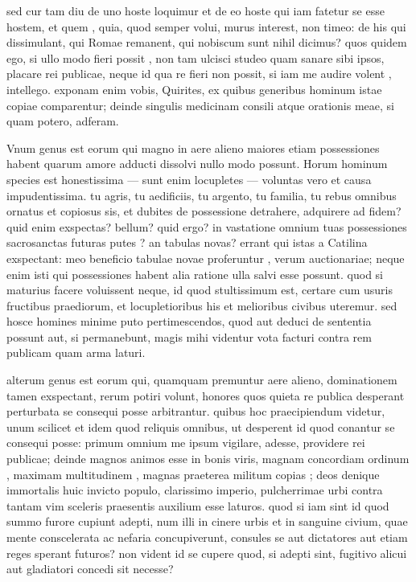  sed cur tam diu de uno hoste loquimur et de eo hoste qui iam fatetur se esse hostem, et quem , quia, quod semper volui, murus interest, non timeo: de his qui dissimulant, qui Romae remanent, qui nobiscum sunt nihil dicimus? quos quidem ego, si ullo modo fieri possit , non tam ulcisci studeo quam sanare sibi ipsos, placare rei publicae, neque id qua re fieri non possit, si iam me audire volent , intellego. exponam enim vobis, Quirites, ex quibus generibus hominum istae copiae comparentur; deinde singulis medicinam consili atque orationis meae, si quam potero, adferam.

 Vnum genus est eorum qui magno in aere alieno maiores etiam possessiones habent quarum amore adducti dissolvi nullo modo possunt. Horum hominum species est honestissima — sunt enim locupletes — voluntas vero et causa impudentissima. tu agris, tu aedificiis, tu argento, tu familia, tu rebus omnibus ornatus et copiosus sis, et dubites de possessione detrahere, adquirere ad fidem? quid enim exspectas? bellum? quid ergo? in vastatione omnium tuas possessiones sacrosanctas futuras putes ? an tabulas novas? errant qui istas a Catilina exspectant: meo beneficio tabulae novae proferuntur , verum auctionariae; neque enim isti qui possessiones habent alia ratione ulla salvi esse possunt. quod si maturius facere voluissent neque, id quod stultissimum est, certare cum usuris fructibus praediorum, et locupletioribus his et melioribus civibus uteremur. sed hosce homines minime puto pertimescendos, quod aut deduci de sententia possunt aut, si permanebunt, magis mihi videntur vota facturi contra rem publicam quam arma laturi.

 alterum genus est eorum qui, quamquam premuntur aere alieno, dominationem tamen exspectant, rerum potiri volunt, honores quos quieta re publica desperant perturbata se consequi posse arbitrantur. quibus hoc praecipiendum videtur, unum scilicet et idem quod reliquis omnibus, ut desperent id quod conantur se consequi posse: primum omnium me ipsum vigilare, adesse, providere rei publicae; deinde magnos animos esse in bonis viris, magnam concordiam ordinum , maximam multitudinem , magnas praeterea militum copias ; deos denique immortalis huic invicto populo, clarissimo imperio, pulcherrimae urbi contra tantam vim sceleris praesentis auxilium esse laturos. quod si iam sint id quod summo furore cupiunt adepti, num illi in cinere urbis et in sanguine civium, quae mente conscelerata ac nefaria concupiverunt, consules se aut dictatores aut etiam reges sperant futuros? non vident id se cupere quod, si adepti sint, fugitivo alicui aut gladiatori concedi sit necesse?

